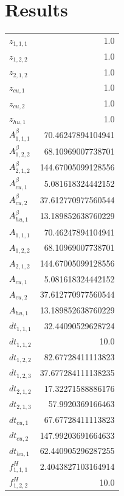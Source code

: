 \documentclass{article}%
\makeatletter
\let\mcnewpage=\newpage%
\newcommand{\TrickSupertabularIntoMulticols}{%
\renewcommand\newpage{%
\if@firstcolumn%
\hrule width\linewidth height0pt%
\columnbreak%
\else%
\mcnewpage%
\fi%
}%
}%
\makeatother
\begin{document}
\section{Results}%
\thispagestyle{plain}%
\begin{multicols*}{3}%
\TrickSupertabularIntoMulticols%
%
\begin{supertabular}{lr}%
	$z_{1,1,1}$ & 1.0 \\%
	$z_{1,2,2}$ & 1.0 \\%
	$z_{2,1,2}$ & 1.0 \\%
	$z_{cu,1}$ & 1.0 \\%
	$z_{cu,2}$ & 1.0 \\%
	$z_{hu,1}$ & 1.0 \\%
	$A_{1,1,1}^{\beta}$ & 70.46247894104941 \\%
	$A_{1,2,2}^{\beta}$ & 68.10969007738701 \\%
	$A_{2,1,2}^{\beta}$ & 144.67005099128556 \\%
	$A_{cu,1}^{\beta}$ & 5.081618324442152 \\%
	$A_{cu,2}^{\beta}$ & 37.612770977560544 \\%
	$A_{hu,1}^{\beta}$ & 13.189852638760229 \\%
	$A_{1,1,1}$ & 70.46247894104941 \\%
	$A_{1,2,2}$ & 68.10969007738701 \\%
	$A_{2,1,2}$ & 144.67005099128556 \\%
	$A_{cu,1}$ & 5.081618324442152 \\%
	$A_{cu,2}$ & 37.612770977560544 \\%
	$A_{hu,1}$ & 13.189852638760229 \\%
	$dt_{1,1,1}$ & 32.44090529628724 \\%
	$dt_{1,1,2}$ & 10.0 \\%
	$dt_{1,2,2}$ & 82.67728411113823 \\%
	$dt_{1,2,3}$ & 37.677284111138235 \\%
	$dt_{2,1,2}$ & 17.32271588886176 \\%
	$dt_{2,1,3}$ & 57.9920369166463 \\%
	$dt_{cu,1}$ & 67.67728411113823 \\%
	$dt_{cu,2}$ & 147.99203691664633 \\%
	$dt_{hu,1}$ & 62.440905296287255 \\%
	$f_{1,1,1}^{H}$ & 2.4043827103164914 \\%
	$f_{1,2,2}^{H}$ & 10.0 \\%

\end{supertabular}
\end{multicols*}
\end{document}
